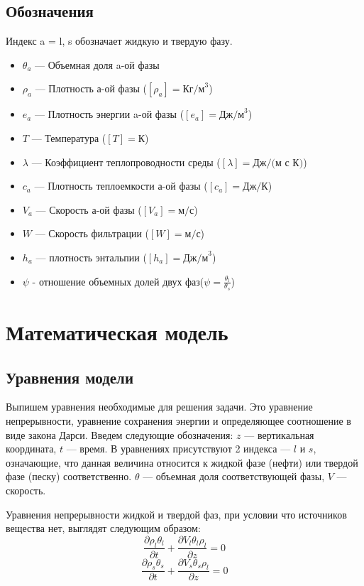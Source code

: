\documentclass[12pt,a4paper]{article}
\newcommand{\pd}[2]{\frac{\partial #1}{\partial #2}}
\begin{document}
\subsection{Обозначения}
Индекс a  = l, s обозначает жидкую и твердую фазу.
\begin{itemize}
\item $\theta_a $ --- Объемная доля a-ой фазы
\item $\rho_a$ --- Плотность а-ой фазы ($[\rho_a] = \text{Кг/м}^3$)
\item $e_a$ --- Плотность энергии a-ой фазы ($[e_a] = \text{Дж/м}^3$)
\item $T $ --- Температура ($[T] =\text{К}$)
\item $\lambda$ --- Коэффициент теплопроводности среды ($[\lambda] = \text{Дж/(м с К)}$)
\item $c_a$ --- Плотность теплоемкости а-ой фазы ($[c_a] = \text{Дж/К}$)
\item $V_a$ --- Скорость а-ой фазы ($[V_a] = \text{м/с} $)
\item $W$ --- Скорость фильтрации ($[W] = \text{м/с} $)
\item $h_a$ --- плотность энтальпии ($[h_a] = \text{Дж/м}^3$)
\item $\psi$ - отношение объемных долей двух фаз($\psi = \frac{\theta_l}{\theta_s} $)
\end{itemize}


\newpage
\section{Математическая модель}
\subsection{Уравнения модели}
Выпишем уравнения необходимые для решения задачи. Это уравнение непрерывности, уравнение сохранения энергии и определяющее соотношение в виде закона Дарси. Введем следующие обозначения: $z$ --- вертикальная координата, $t$ --- время. В уравнениях присутствуют 2 индекса --- $ l $ и $ s$, означающие, что данная величина относится к жидкой фазе (нефти) или твердой фазе (песку) соответственно. $\theta$ --- объемная доля соответствующей фазы, $ V $ --- скорость.

Уравнения непрерывности жидкой и твердой фаз, при условии что источников вещества нет, выглядят следующим образом:
\begin{equation}
\pd{\rho_l\theta_l}{t} + \pd{V_l\theta_l\rho_l}{z} =0
\label{eq:contin_l}
\end{equation}
\begin{equation}
\pd{\rho_s\theta_s}{t} + \pd{V_s\theta_s\rho_l}{z} =0
\label{eq:contin_s}
\end{equation}
\end{document}
